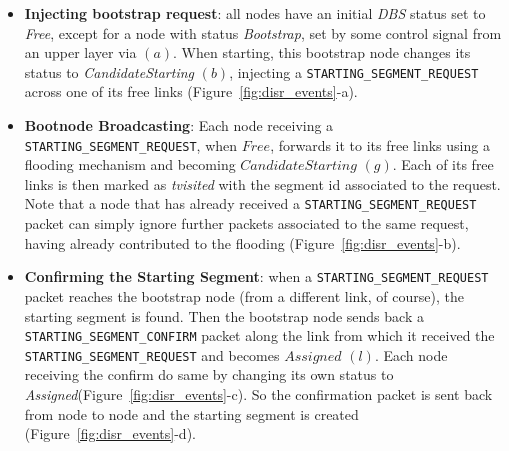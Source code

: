 \begin{itemize}
\item{\textbf{Injecting bootstrap request}}: all nodes have an initial
\emph{DBS} status set to \emph{Free}, except for a
 node with status \emph{Bootstrap}, set by some control signal from an
upper layer via $(a)$. When starting, this bootstrap node 
changes its status to \emph{CandidateStarting} $(b)$, injecting a
\texttt{STARTING\_SEGMENT\_REQUEST} across one of its free links
(Figure~\ref{fig:disr_events}-a). 

\item{\textbf{Bootnode Broadcasting}}: Each node receiving a \texttt{STARTING\_SEGMENT\_REQUEST},
when $Free$, forwards it to its free links using a flooding mechanism and
becoming $CandidateStarting$ $(g)$.
Each of its free links is then marked as \emph{tvisited} with the segment id
associated to the request. Note that a node that has already received a
\texttt{STARTING\_SEGMENT\_REQUEST} packet can simply ignore further packets
associated to the same request, having already contributed to the
flooding (Figure~\ref{fig:disr_events}-b).

\item{\textbf{Confirming the Starting Segment}}: when a \texttt{STARTING\_SEGMENT\_REQUEST} packet reaches
the bootstrap node (from a different link, of course), the starting
segment is found. Then the bootstrap node sends back a \texttt{STARTING\_SEGMENT\_CONFIRM}
packet along the link from which it received the
\texttt{STARTING\_SEGMENT\_REQUEST} and becomes $Assigned$ $(l)$. Each
node receiving the confirm do same by changing its own status
to \emph{Assigned}(Figure~\ref{fig:disr_events}-c). So the confirmation packet is sent back from
node to node and the starting segment is created (Figure~\ref{fig:disr_events}-d). 





\end{itemize}

